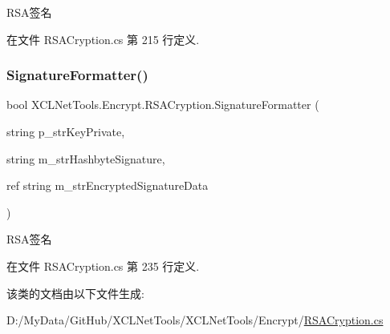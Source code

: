 R\+S\+A签名 



在文件 R\+S\+A\+Cryption.\+cs 第 215 行定义.

\mbox{\label{class_x_c_l_net_tools_1_1_encrypt_1_1_r_s_a_cryption_a7f010e16f780f80fd0d702c2f6bd7af2}} 
\subsubsection{\texorpdfstring{Signature\+Formatter()}{SignatureFormatter()}\hspace{0.1cm}{\footnotesize\ttfamily [4/4]}}
{\footnotesize\ttfamily bool X\+C\+L\+Net\+Tools.\+Encrypt.\+R\+S\+A\+Cryption.\+Signature\+Formatter (\begin{DoxyParamCaption}\item[{string}]{p\+\_\+str\+Key\+Private,  }\item[{string}]{m\+\_\+str\+Hashbyte\+Signature,  }\item[{ref string}]{m\+\_\+str\+Encrypted\+Signature\+Data }\end{DoxyParamCaption})}



R\+S\+A签名 



在文件 R\+S\+A\+Cryption.\+cs 第 235 行定义.



该类的文档由以下文件生成\+:\begin{DoxyCompactItemize}
\item 
D\+:/\+My\+Data/\+Git\+Hub/\+X\+C\+L\+Net\+Tools/\+X\+C\+L\+Net\+Tools/\+Encrypt/\hyperlink{_r_s_a_cryption_8cs}{R\+S\+A\+Cryption.\+cs}\end{DoxyCompactItemize}
